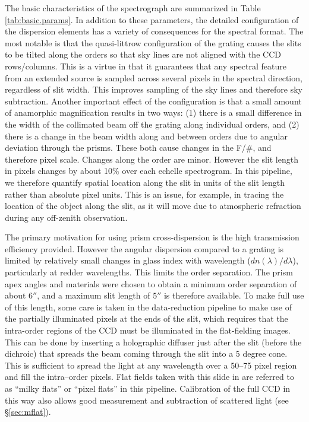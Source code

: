 \documentclass[]{emulateapj}
\begin{document}
The basic characteristics of the spectrograph are summarized in Table
\ref{tab:basic.params}.  In addition to these parameters, the detailed
configuration of the dispersion elements has a variety of consequences
for the spectral format.  The most notable is that the quasi-littrow
configuration of the grating causes the slits to be tilted along the
orders so that sky lines are not aligned with the CCD rows/columns.
This is a virtue in that it guarantees that any spectral feature from
an extended source is sampled across several pixels in the spectral
direction, regardless of slit width. This improves sampling of the sky
lines and therefore sky subtraction.  Another important effect of the
configuration is that a small amount of anamorphic magnification
results in two ways: 
(1) there is a small difference in the width of the
collimated beam off the grating along individual orders, and 
(2) there is
a change in the beam width along and between orders due to angular
deviation through the prisms.  These both cause changes in the F/\#,
and therefore pixel scale.  Changes along the order are minor.
However the slit length in pixels changes by about 10\% over 
each echelle spectrogram.  
In this pipeline, we therefore quantify spatial location
along the slit in units of the slit length rather than absolute
pixel units.
This is an issue, for example, in tracing the location of the object
along the slit, as it will move due to atmospheric refraction during
any off-zenith observation.

The primary motivation for using prism cross-dispersion is the high
transmission efficiency provided.  However the angular dispersion
compared to a grating is limited by relatively small changes in glass
index with wavelength ($dn(\lambda)/d\lambda$), particularly at redder
wavelengths. This limits the order separation.  The prism apex angles
and materials were chosen to obtain a minimum order separation of
about $6''$, and a maximum slit length of $5''$ is therefore
available.  To make full use of this length, some care is taken in the
data-reduction pipeline to make 
use of the partially illuminated pixels at the ends
of the slit, which requires that the intra-order regions of the
CCD must be illuminated in the flat-fielding images.  This can be done
by inserting a holographic diffuser just after the slit (before the
dichroic) that spreads the beam coming through the slit into a 5
degree cone. This is sufficient to spread the light at any wavelength
over a 50--75 pixel region and fill the intra--order pixels.  Flat
fields taken with this slide in are referred to as ``milky flats''
or ``pixel flats'' in this pipeline.  Calibration of the
full CCD in this way also allows good measurement and subtraction
of scattered light  (see \S \ref{sec:mflat}).
\end{document}
